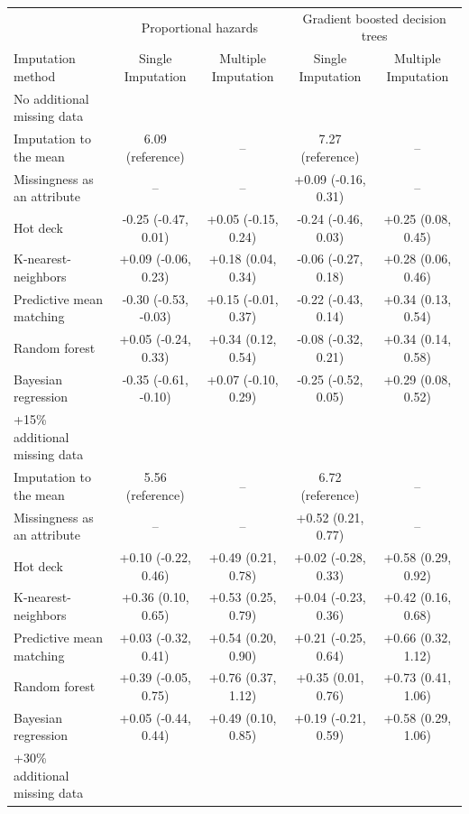 \documentclass{article}
\begin{document}
\begin{table}
\begin{tabular}{lcccc}
\toprule
& \multicolumn{2}{c}{Proportional hazards} & \multicolumn{2}{c}{Gradient boosted decision trees} \\ 
 \cmidrule(lr){2-3}\cmidrule(lr){4-5}
Imputation method & Single Imputation & Multiple Imputation & Single Imputation & Multiple Imputation \\ 
\midrule
\multicolumn{1}{l}{No additional missing data} \\ 
\midrule
Imputation to the mean & 6.09 (reference) & -- & 7.27 (reference) & -- \\ 
Missingness as an attribute & -- & -- & +0.09 (-0.16, 0.31) & -- \\ 
Hot deck & -0.25 (-0.47, 0.01) & +0.05 (-0.15, 0.24) & -0.24 (-0.46, 0.03) & +0.25 (0.08, 0.45) \\ 
K-nearest-neighbors & +0.09 (-0.06, 0.23) & +0.18 (0.04, 0.34) & -0.06 (-0.27, 0.18) & +0.28 (0.06, 0.46) \\ 
Predictive mean matching & -0.30 (-0.53, -0.03) & +0.15 (-0.01, 0.37) & -0.22 (-0.43, 0.14) & +0.34 (0.13, 0.54) \\ 
Random forest & +0.05 (-0.24, 0.33) & +0.34 (0.12, 0.54) & -0.08 (-0.32, 0.21) & +0.34 (0.14, 0.58) \\ 
Bayesian regression & -0.35 (-0.61, -0.10) & +0.07 (-0.10, 0.29) & -0.25 (-0.52, 0.05) & +0.29 (0.08, 0.52) \\ 
\midrule
\multicolumn{1}{l}{+15\% additional missing data} \\ 
\midrule
Imputation to the mean & 5.56 (reference) & -- & 6.72 (reference) & -- \\ 
Missingness as an attribute & -- & -- & +0.52 (0.21, 0.77) & -- \\ 
Hot deck & +0.10 (-0.22, 0.46) & +0.49 (0.21, 0.78) & +0.02 (-0.28, 0.33) & +0.58 (0.29, 0.92) \\ 
K-nearest-neighbors & +0.36 (0.10, 0.65) & +0.53 (0.25, 0.79) & +0.04 (-0.23, 0.36) & +0.42 (0.16, 0.68) \\ 
Predictive mean matching & +0.03 (-0.32, 0.41) & +0.54 (0.20, 0.90) & +0.21 (-0.25, 0.64) & +0.66 (0.32, 1.12) \\ 
Random forest & +0.39 (-0.05, 0.75) & +0.76 (0.37, 1.12) & +0.35 (0.01, 0.76) & +0.73 (0.41, 1.06) \\ 
Bayesian regression & +0.05 (-0.44, 0.44) & +0.49 (0.10, 0.85) & +0.19 (-0.21, 0.59) & +0.58 (0.29, 1.06) \\ 
\midrule
\multicolumn{1}{l}{+30\% additional missing data} \\ 

\end{tabular}
\end{table}
\end{document}
